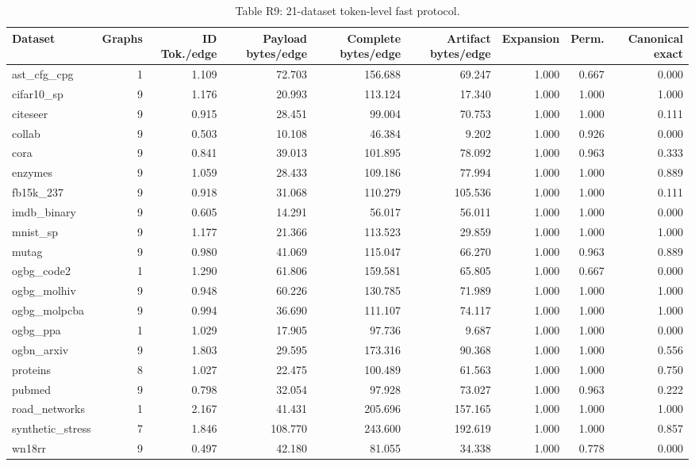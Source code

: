 \begin{table}[t]
\centering
\caption{Table R9: 21-dataset token-level fast protocol.}
\begin{tabular}{lrrrrrrrr}
\toprule
Dataset & Graphs & ID Tok./edge & Payload bytes/edge & Complete bytes/edge & Artifact bytes/edge & Expansion & Perm. & Canonical exact \\
\midrule
ast\_cfg\_cpg & 1 & 1.109 & 72.703 & 156.688 & 69.247 & 1.000 & 0.667 & 0.000 \\
cifar10\_sp & 9 & 1.176 & 20.993 & 113.124 & 17.340 & 1.000 & 1.000 & 1.000 \\
citeseer & 9 & 0.915 & 28.451 & 99.004 & 70.753 & 1.000 & 1.000 & 0.111 \\
collab & 9 & 0.503 & 10.108 & 46.384 & 9.202 & 1.000 & 0.926 & 0.000 \\
cora & 9 & 0.841 & 39.013 & 101.895 & 78.092 & 1.000 & 0.963 & 0.333 \\
enzymes & 9 & 1.059 & 28.433 & 109.186 & 77.994 & 1.000 & 1.000 & 0.889 \\
fb15k\_237 & 9 & 0.918 & 31.068 & 110.279 & 105.536 & 1.000 & 1.000 & 0.111 \\
imdb\_binary & 9 & 0.605 & 14.291 & 56.017 & 56.011 & 1.000 & 1.000 & 0.000 \\
mnist\_sp & 9 & 1.177 & 21.366 & 113.523 & 29.859 & 1.000 & 1.000 & 1.000 \\
mutag & 9 & 0.980 & 41.069 & 115.047 & 66.270 & 1.000 & 0.963 & 0.889 \\
ogbg\_code2 & 1 & 1.290 & 61.806 & 159.581 & 65.805 & 1.000 & 0.667 & 0.000 \\
ogbg\_molhiv & 9 & 0.948 & 60.226 & 130.785 & 71.989 & 1.000 & 1.000 & 1.000 \\
ogbg\_molpcba & 9 & 0.994 & 36.690 & 111.107 & 74.117 & 1.000 & 1.000 & 1.000 \\
ogbg\_ppa & 1 & 1.029 & 17.905 & 97.736 & 9.687 & 1.000 & 1.000 & 0.000 \\
ogbn\_arxiv & 9 & 1.803 & 29.595 & 173.316 & 90.368 & 1.000 & 1.000 & 0.556 \\
proteins & 8 & 1.027 & 22.475 & 100.489 & 61.563 & 1.000 & 1.000 & 0.750 \\
pubmed & 9 & 0.798 & 32.054 & 97.928 & 73.027 & 1.000 & 0.963 & 0.222 \\
road\_networks & 1 & 2.167 & 41.431 & 205.696 & 157.165 & 1.000 & 1.000 & 1.000 \\
synthetic\_stress & 7 & 1.846 & 108.770 & 243.600 & 192.619 & 1.000 & 1.000 & 0.857 \\
wn18rr & 9 & 0.497 & 42.180 & 81.055 & 34.338 & 1.000 & 0.778 & 0.000 \\
\bottomrule
\end{tabular}
\end{table}
